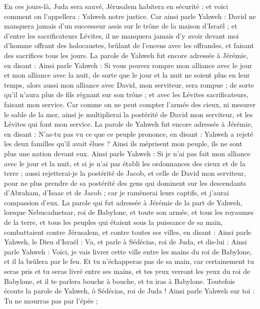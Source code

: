 \begin{multicols}{2}
En ces jours-là, Juda sera sauvé, Jérusalem habitera en sécurité ; et voici comment on l'appellera : Yahweh notre justice.
Car ainsi parle Yahweh : David ne manquera jamais d'un successeur assis sur le trône de la maison d'Israël ;
et d'entre les sacrificateurs Lévites, il ne manquera jamais d'y avoir devant moi d'homme offrant des holocaustes, brûlant de l'encens avec les offrandes, et faisant des sacrifices tous les jours.
La parole de Yahweh fut encore adressée à Jérémie, en disant :
Ainsi parle Yahweh : Si vous pouvez rompre mon alliance avec le jour et mon alliance avec la nuit, de sorte que le jour et la nuit ne soient plus en leur temps,
alors aussi mon alliance avec David, mon serviteur, sera rompue ; de sorte qu'il n'aura plus de fils régnant sur son trône ; et avec les Lévites sacrificateurs, faisant mon service.
Car comme on ne peut compter l'armée des cieux, ni mesurer le sable de la mer, ainsi je multiplierai la postérité de David mon serviteur, et les Lévites qui font mon service.
La parole de Yahweh fut encore adressée à Jérémie, en disant :
N'as-tu pas vu ce que ce peuple prononce, en disant : Yahweh a rejeté les deux familles qu'il avait élues ? Ainsi ils méprisent mon peuple, ils ne sont plus une nation devant eux.
Ainsi parle Yahweh : Si je n'ai pas fait mon alliance avec le jour et la nuit, et si je n'ai pas établi les ordonnances des cieux et de la terre ;
aussi rejetterai-je la postérité de Jacob, et celle de David mon serviteur, pour ne plus prendre de sa postérité des gens qui dominent sur les descendants d'Abraham, d'Isaac et de Jacob ; car je ramènerai leurs captifs, et j'aurai compassion d'eux.
\VerseOne{}La parole qui fut adressée à Jérémie de la part de Yahweh, lorsque Nebucadnetsar, roi de Babylone, et toute son armée, et tous les royaumes de la terre, et tous les peuples qui étaient sous la puissance de sa main, combattaient contre Jérusalem, et contre toutes ses villes, en disant :
Ainsi parle Yahweh, le Dieu d'Israël : Va, et parle à Sédécias, roi de Juda, et dis-lui : Ainsi parle Yahweh : Voici, je vais livrer cette ville entre les mains du roi de Babylone, et il la brûlera par le feu.
Et tu n'échapperas pas de sa main, car certainement tu seras pris et tu seras livré entre ses mains, et tes yeux verront les yeux du roi de Babylone, et il te parlera bouche à bouche, et tu iras à Babylone.
Toutefois écoute la parole de Yahweh, ô Sédécias, roi de Juda ! Ainsi parle Yahweh sur toi : Tu ne mourras pas par l'épée ;

\end{multicols}
